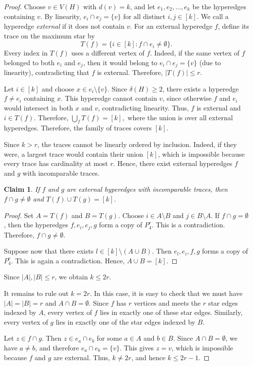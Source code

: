 \documentclass[11pt,a4paper]{article}
\newtheorem{claim}[theorem]{Claim}
\theoremstyle{definition}
\theoremstyle{remark}
\begin{document}
\begin{proof}
Choose $v\in V(H)$ with $d(v)=k$, and let $e_1,e_2,\ldots,e_k$
be the hyperedges containing $v$. By linearity, $e_i\cap e_j=\{v\}
\text{ for all distinct }i,j\in[k].$
We call a hyperedge \emph{external} if it does not contain $v$. For an
external hyperedge $f$, define its trace on the maximum star by
$$
T(f)=\{i\in[k]:f\cap e_i\neq\emptyset\}.
$$
Every index in $T(f)$ uses a different vertex of $f$. Indeed, if the
same vertex of $f$ belonged to both $e_i$ and $e_j$, then it would
belong to $e_i\cap e_j=\{v\}$ (due to linearity), contradicting that $f$ is external.
Therefore, $|T(f)|\leq r.$

Let $i\in[k]$ and
choose $x\in e_i\setminus\{v\}$. Since $\delta(H)\geq 2$, there exists
a hyperedge $f\neq e_i$ containing $x$. This hyperedge cannot contain
$v$, since otherwise $f$ and $e_i$ would intersect in both $x$ and
$v$, contradicting linearity. Thus, $f$ is external and $i\in T(f)$.
Therefore, $\bigcup_fT(f)=[k],$
where the union is over all external hyperedges. Therefore, the family of traces covers $[k]$.

Since $k>r$, the traces cannot be linearly ordered by inclusion. Indeed,
if they were, a largest trace would contain their union $[k]$, which is
impossible because every trace has cardinality at most $r$. Hence,
there exist external hyperedges $f$ and $g$ with incomparable traces.

\begin{claim}
    If $f$ and $g$ are external hyperedges with incomparable traces, then $f\cap g \neq \emptyset$ and $T(f)\cup T(g) = [k]$.
\end{claim}
\begin{proof} Set
$A=T(f)$ and $B=T(g)$. Choose $i\in A\setminus B$ and $j\in B\setminus A.$
If $f\cap g=\emptyset$, then the hyperedges
$f,e_i,e_j,g$
form a copy of $P_4^r$. This is a contradiction.
Therefore, $f\cap g\neq\emptyset.$

Suppose now that there exists
$l\in[k]\setminus(A\cup B)$. Then $
e_l,e_i,f,g$ forms a copy of $P_4^r$. This is again a contradiction. Hence, $
A\cup B=[k].$\end{proof}

Since $|A|,|B|\leq r$, we obtain $k\leq 2r$.

It remains to rule out $k=2r$. In this case, it is easy to check that we must have $|A|=|B|=r$ and
$A\cap B=\emptyset$.
Since $f$ has $r$ vertices and meets the $r$ star edges indexed by
$A$, every vertex of $f$ lies in exactly one of these star edges.
Similarly, every vertex of $g$ lies in exactly one of the star edges
indexed by $B$. 

Let $z\in f\cap g$. Then $z\in e_a\cap e_b$
for some $a\in A$ and $b\in B$. Since $A\cap B=\emptyset$, we have
$a\neq b$, and therefore $e_a\cap e_b=\{v\}$. This gives $z=v$, which
is impossible because $f$ and $g$ are external. Thus, $k\neq 2r$, and
hence $k\leq 2r-1$.
\end{proof}
\end{document}
